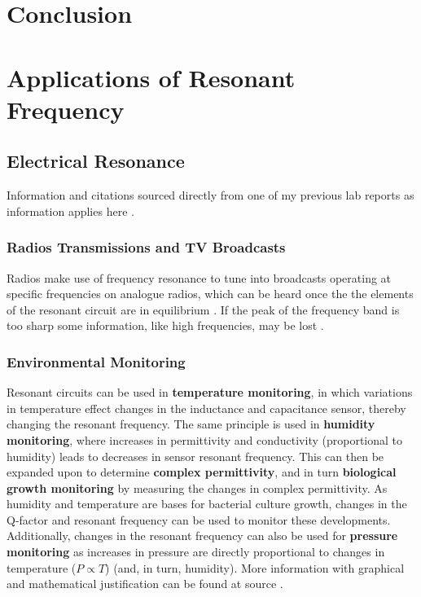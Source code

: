 \documentclass[12pt]{article}
\begin{document}
\newpage

\section{Conclusion} \label{sec:4}



\section{Applications of Resonant Frequency}

\subsection{Electrical Resonance}

Information and citations sourced directly from one of my previous lab reports as information applies here \cite{meUCDlcr}.

\subsubsection{Radios Transmissions and TV Broadcasts}

Radios make use of frequency resonance to tune into broadcasts operating at specific frequencies on analogue radios, which can be heard once the the elements of the resonant circuit are in equilibrium
\cite{radio}. 
If the peak of the frequency band is too sharp some information, like high frequencies, may be lost
\cite{UCDlcr}.

\subsubsection{Environmental Monitoring}

Resonant circuits can be used in \textbf{temperature monitoring}, in which variations in \break temperature effect changes in the inductance and capacitance sensor, thereby changing the resonant frequency.
The same principle is used in \textbf{humidity monitoring}, where increases in permittivity and conductivity (proportional to humidity) leads to decreases in sensor resonant 
frequency.
This can then be expanded upon to determine \textbf{complex permittivity}, and in turn \textbf{biological growth monitoring} by measuring the changes in complex permittivity.
As humidity and temperature are bases for bacterial culture growth, changes in the Q-factor and resonant frequency can be used to monitor these developments.
Additionally, changes in the resonant frequency can also be used for \textbf{pressure monitoring} as increases in pressure are directly proportional to changes in temperature ($P \propto T$) (and, in turn, humidity).
More information with graphical and mathematical justification can be found at source \cite{ONG200133}.
\end{document}
